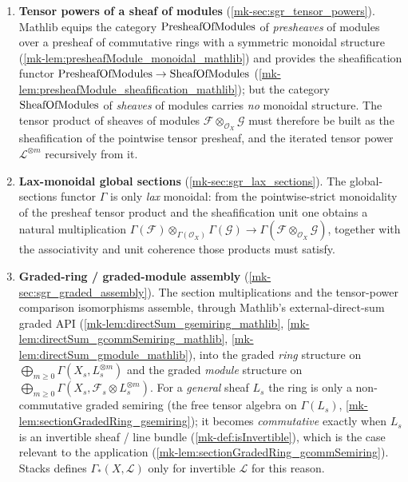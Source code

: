 \begin{enumerate}
  \item \textbf{Tensor powers of a sheaf of modules}
    (\ref{mk-sec:sgr_tensor_powers}). Mathlib equips the category
    \(\mathrm{PresheafOfModules}\) of \emph{presheaves} of modules over a presheaf of commutative
    rings with a symmetric monoidal structure
    (\ref{mk-lem:presheafModule_monoidal_mathlib}) and provides the
    sheafification functor \(\mathrm{PresheafOfModules} \to \mathrm{SheafOfModules}\)
    (\ref{mk-lem:presheafModule_sheafification_mathlib}); but the category
    \(\mathrm{SheafOfModules}\) of \emph{sheaves} of modules carries \emph{no} monoidal
    structure. The tensor product of sheaves of modules
    \(\mathcal{F} \otimes_{\mathcal{O}_X} \mathcal{G}\) must therefore be built
    as the sheafification of the pointwise tensor presheaf, and the iterated
    tensor power \(\mathcal{L}^{\otimes m}\) recursively from it.
  \item \textbf{Lax-monoidal global sections} (\ref{mk-sec:sgr_lax_sections}).
    The global-sections functor \(\Gamma\) is only \emph{lax} monoidal: from the
    pointwise-strict monoidality of the presheaf tensor product and the
    sheafification unit one obtains a natural multiplication
    \(\Gamma(\mathcal{F}) \otimes_{\Gamma(\mathcal{O}_X)} \Gamma(\mathcal{G})
    \to \Gamma(\mathcal{F} \otimes_{\mathcal{O}_X} \mathcal{G})\), together with
    the associativity and unit coherence those products must satisfy.
  \item \textbf{Graded-ring / graded-module assembly}
    (\ref{mk-sec:sgr_graded_assembly}). The section multiplications and the
    tensor-power comparison isomorphisms assemble, through Mathlib's
    external-direct-sum graded API (\ref{mk-lem:directSum_gsemiring_mathlib},
    \ref{mk-lem:directSum_gcommSemiring_mathlib}, \ref{mk-lem:directSum_gmodule_mathlib}),
    into the graded \emph{ring} structure on
    \(\bigoplus_{m \ge 0} \Gamma(X_s, L_s^{\otimes m})\) and the graded
    \emph{module} structure on
    \(\bigoplus_{m \ge 0} \Gamma(X_s, \mathcal{F}_s \otimes L_s^{\otimes m})\).
    For a \emph{general} sheaf \(L_s\) the ring is only a non-commutative graded
    semiring (the free tensor algebra on \(\Gamma(L_s)\),
    \ref{mk-lem:sectionGradedRing_gsemiring}); it becomes \emph{commutative} exactly
    when \(L_s\) is an invertible sheaf / line bundle (\ref{mk-def:isInvertible}),
    which is the case relevant to the application
    (\ref{mk-lem:sectionGradedRing_gcommSemiring}). Stacks defines
    \(\Gamma_*(X,\mathcal{L})\) only for invertible \(\mathcal{L}\) for this reason.
\end{enumerate}

